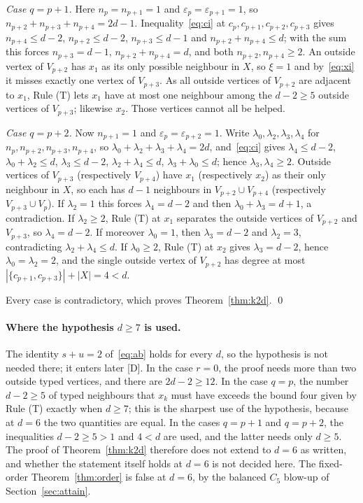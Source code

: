 \documentclass[11pt]{article}
\theoremstyle{remark}
\begin{document}
\emph{Case $q=p+1$.} Here $n_p=n_{p+1}=1$ and $\varepsilon_p=\varepsilon_{p+1}=1$, so $n_{p+2}+n_{p+3}+n_{p+4}=2d-1$. Inequality~\eqref{eq:ci} at $c_p,c_{p+1},c_{p+2},c_{p+3}$ gives $n_{p+4}\le d-2$, $n_{p+2}\le d-2$, $n_{p+3}\le d-1$ and $n_{p+2}+n_{p+4}\le d$; with the sum this forces $n_{p+3}=d-1$, $n_{p+2}+n_{p+4}=d$, and both $n_{p+2},n_{p+4}\ge2$. An outside vertex of $V_{p+2}$ has $x_1$ as its only possible neighbour in $X$, so $\xi=1$ and by~\eqref{eq:xi} it misses exactly one vertex of $V_{p+3}$. As all outside vertices of $V_{p+2}$ are adjacent to $x_1$, Rule (T) lets $x_1$ have at most one neighbour among the $d-2\ge5$ outside vertices of $V_{p+3}$; likewise $x_2$. Those vertices cannot all be helped.

\emph{Case $q=p+2$.} Now $n_{p+1}=1$ and $\varepsilon_p=\varepsilon_{p+2}=1$. Write $\lambda_0,\lambda_2,\lambda_3,\lambda_4$ for $n_p,n_{p+2},n_{p+3},n_{p+4}$, so $\lambda_0+\lambda_2+\lambda_3+\lambda_4=2d$, and~\eqref{eq:ci} gives $\lambda_4\le d-2$, $\lambda_0+\lambda_2\le d$, $\lambda_3\le d-2$, $\lambda_2+\lambda_4\le d$, $\lambda_3+\lambda_0\le d$; hence $\lambda_3,\lambda_4\ge2$. Outside vertices of $V_{p+3}$ (respectively $V_{p+4}$) have $x_1$ (respectively $x_2$) as their only neighbour in $X$, so each has $d-1$ neighbours in $V_{p+2}\cup V_{p+4}$ (respectively $V_{p+3}\cup V_p$). If $\lambda_2=1$ this forces $\lambda_4=d-2$ and then $\lambda_0+\lambda_3=d+1$, a contradiction. If $\lambda_2\ge2$, Rule (T) at $x_1$ separates the outside vertices of $V_{p+2}$ and $V_{p+3}$, so $\lambda_4=d-2$. If moreover $\lambda_0=1$, then $\lambda_3=d-2$ and $\lambda_2=3$, contradicting $\lambda_2+\lambda_4\le d$. If $\lambda_0\ge2$, Rule (T) at $x_2$ gives $\lambda_3=d-2$, hence $\lambda_0=\lambda_2=2$, and the single outside vertex of $V_{p+2}$ has degree at most $|\{c_{p+1},c_{p+3}\}|+|X|=4<d$.

Every case is contradictory, which proves Theorem~\ref{thm:k2d}. \qed

\paragraph{Where the hypothesis $d\ge7$ is used.} The identity $s+u=2$ of~\eqref{eq:ab} holds for every $d$, so the hypothesis is not needed there; it enters later [D]. In the case $r=0$, the proof needs more than two outside typed vertices, and there are $2d-2\ge12$. In the case $q=p$, the number $d-2\ge5$ of typed neighbours that $x_k$ must have exceeds the bound four given by Rule (T) exactly when $d\ge7$; this is the sharpest use of the hypothesis, because at $d=6$ the two quantities are equal. In the cases $q=p+1$ and $q=p+2$, the inequalities $d-2\ge5>1$ and $4<d$ are used, and the latter needs only $d\ge5$. The proof of Theorem~\ref{thm:k2d} therefore does not extend to $d=6$ as written, and whether the statement itself holds at $d=6$ is not decided here. The fixed-order Theorem~\ref{thm:order} is false at $d=6$, by the balanced $C_5$ blow-up of Section~\ref{sec:attain}.
\end{document}
